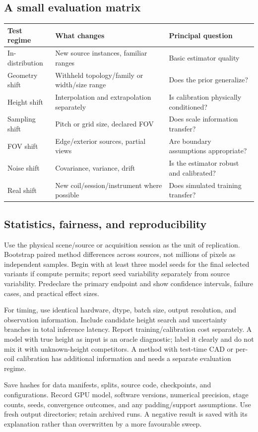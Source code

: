 \subsection{A small evaluation matrix}
\begin{tabularx}{\linewidth}{P{32mm}YY}
\toprule Test regime & What changes & Principal question\\\midrule
In-distribution & New source instances, familiar ranges & Basic estimator quality\\
Geometry shift & Withheld topology/family or width/size range & Does the prior generalize?\\
Height shift & Interpolation and extrapolation separately & Is calibration physically conditioned?\\
Sampling shift & Pitch or grid size, declared FOV & Does scale information transfer?\\
FOV shift & Edge/exterior sources, partial views & Are boundary assumptions appropriate?\\
Noise shift & Covariance, variance, drift & Is the estimator robust and calibrated?\\
Real shift & New coil/session/instrument where possible & Does simulated training transfer?\\\bottomrule
\end{tabularx}

\subsection{Statistics, fairness, and reproducibility}
Use the physical scene/source or acquisition session as the unit of replication. Bootstrap paired method differences across sources, not millions of pixels as independent samples. Begin with at least three model seeds for the final selected variants if compute permits; report seed variability separately from source variability. Predeclare the primary endpoint and show confidence intervals, failure cases, and practical effect sizes.

For timing, use identical hardware, dtype, batch size, output resolution, and observation information. Include candidate height search and uncertainty branches in total inference latency. Report training/calibration cost separately. A model with true height as input is an oracle diagnostic; label it clearly and do not mix it with unknown-height competitors. A method with test-time CAD or per-coil calibration has additional information and needs a separate evaluation regime.

Save hashes for data manifests, splits, source code, checkpoints, and configurations. Record GPU model, software versions, numerical precision, stage counts, seeds, convergence outcomes, and any padding/support assumptions. Use fresh output directories; retain archived runs. A negative result is saved with its explanation rather than overwritten by a more favourable sweep.

